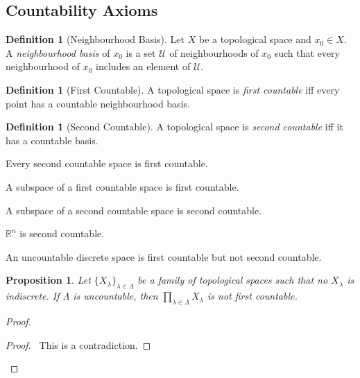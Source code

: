 \documentclass{book}
\let\qed\relax
\newtheorem{prop}[ax]{Proposition}
\theoremstyle{definition}
\newtheorem{df}[ax]{Definition}
\begin{document}
\subsection{Countability Axioms}

\begin{df}[Neighbourhood Basis]
Let $X$ be a topological space and $x_0 \in X$. A \emph{neighbourhood basis} of $x_0$ is a set $\mathcal{U}$ of neighbourhoods of $x_0$ such that every neighbourhood of $x_0$ includes an element of $\mathcal{U}$.
\end{df}

\begin{df}[First Countable]
A topological space is \emph{first countable} iff every point has a countable neighbourhood basis.
\end{df}

\begin{df}[Second Countable]
A topological space is \emph{second countable} iff it has a countable basis.
\end{df}

Every second countable space is first countable.

A subspace of a first countable space is first countable.

A subspace of a second countable space is second countable.

$\mathbb{R}^n$ is second countable.

An uncountable discrete space is first countable but not second countable.

\begin{prop}
Let $\{ X_\lambda \}_{\lambda \in \Lambda}$ be a family of topological spaces such that no $X_\lambda$ is indiscrete. If $\Lambda$ is uncountable, then $\prod_{\lambda \in \Lambda} X_\lambda$ is not first countable.
\end{prop}

\begin{proof}
\pf
{}
\qedstep
\begin{proof}
\pf\ This is a contradiction.
\end{proof}
\qed
\end{proof}
\end{document}
